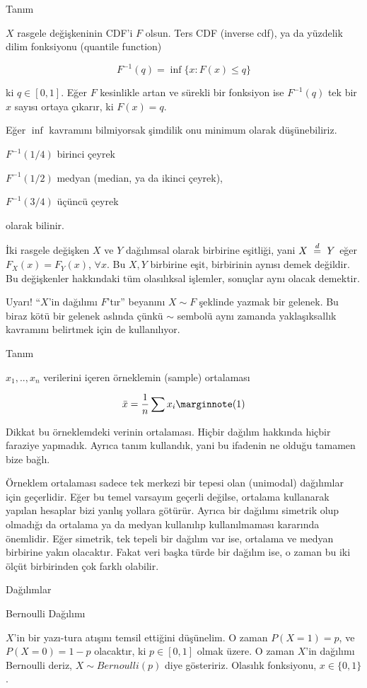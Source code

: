 \documentclass[12pt,fleqn]{article}\usepackage{../../common}
\begin{document}
Tanım

$X$ rasgele değişkeninin CDF'i $F$ olsun. Ters CDF (inverse cdf), ya da yüzdelik
dilim fonksiyonu (quantile function)

$$ F^{-1}(q) = \inf \bigg\{ x: F(x) \le q \bigg\} $$

ki $q \in [0,1]$. Eğer $F$ kesinlikle artan ve sürekli bir fonksiyon ise
$F^{-1}(q)$ tek bir $x$ sayısı ortaya çıkarır, ki $F(x) = q$. 

Eğer $\inf$ kavramını bilmiyorsak şimdilik onu minimum olarak düşünebiliriz. 

$F^{-1}(1/4)$ birinci çeyrek

$F^{-1}(1/2)$ medyan (median, ya da ikinci çeyrek), 

$F^{-1}(3/4)$ üçüncü çeyrek 

olarak bilinir. 

İki rasgele değişken $X$ ve $Y$ dağılımsal olarak birbirine eşitliği, yani
$X \ \buildrel d \over = \ Y$ eğer $F_X(x) = F_Y(x)$, $\forall x$. Bu $X,Y$ birbirine eşit, birbirinin 
aynısı demek değildir. Bu değişkenler hakkındaki tüm olasılıksal işlemler, 
sonuçlar aynı olacak demektir.

Uyarı! ``$X$'in dağılımı $F$'tır'' beyanını $X \sim F$ şeklinde yazmak bir
gelenek. Bu biraz kötü bir gelenek aslında çünkü $\sim$ sembolü aynı
zamanda yaklaşıksallık kavramını belirtmek için de kullanılıyor.


Tanım

$x_1,..,x_n$ verilerini içeren örneklemin (sample) ortalaması 

$$ \bar{x} = \frac{1}{n} \sum x_i
\mlabel{1}
$$

Dikkat bu örneklemdeki verinin ortalaması. Hiçbir dağılım hakkında hiçbir
faraziye yapmadık. Ayrıca tanım kullandık, yani bu ifadenin ne olduğu
tamamen bize bağlı. 

Örneklem ortalaması sadece tek merkezi bir tepesi olan (unimodal)
dağılımlar için geçerlidir. Eğer bu temel varsayım geçerli değilse,
ortalama kullanarak yapılan hesaplar bizi yanlış yollara götürür. Ayrıca
bir dağılımı simetrik olup olmadığı da ortalama ya da medyan kullanılıp
kullanılmaması kararında önemlidir. Eğer simetrik, tek tepeli bir dağılım
var ise, ortalama ve medyan birbirine yakın olacaktır. Fakat veri başka
türde bir dağılım ise, o zaman bu iki ölçüt birbirinden çok farklı
olabilir.

Dağılımlar

Bernoulli Dağılımı

$X$'in bir yazı-tura atışını temsil ettiğini düşünelim. O zaman $P(X = 1) =p$, 
ve $P(X = 0) = 1 - p$ olacaktır, ki $p \in [0,1]$ olmak üzere. O zaman
$X$'in dağılımı Bernoulli deriz, $X \sim Bernoulli(p)$ diye
gösteririz. Olasılık fonksiyonu, $x \in \{0,1\}$.
\end{document}
